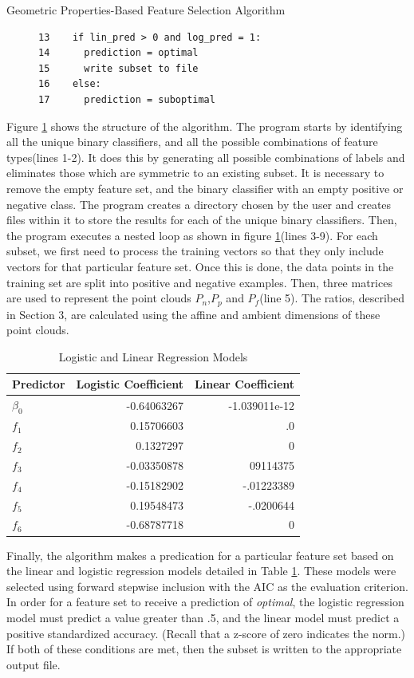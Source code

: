 \documentclass{llncs}
\begin{document}
\begin{section}{Geometric Properties-Based Feature Selection Algorithm}
\begin{figure}[h]
\begin{lstlisting}
13	  if lin_pred > 0 and log_pred = 1:
14		prediction = optimal
15		write subset to file
16	  else:
17		prediction = suboptimal
\end{lstlisting}
\label{fig:code}
\end{figure}
Figure \ref{fig:code} shows the structure of the algorithm. The program starts by identifying all the unique binary classifiers, and all the possible combinations of feature types(lines 1-2). It does this by generating all possible combinations of  labels and eliminates those which are symmetric to an existing subset. It is necessary to remove the empty feature set, and the binary classifier with an empty positive or negative class. The program creates a directory chosen by the user and creates files within it to store the results for each of the unique binary classifiers. Then, the program executes a nested loop as shown in figure \ref{fig:code}(lines 3-9). 
For each subset, we first need to process the training vectors so that they only include vectors for that particular feature set. Once this is done, the data points in the training set are split into positive and negative examples. Then, three matrices are used to represent the point clouds $P_n$,$P_p$ and $P_f$(line 5). The ratios, described in Section 3, are calculated using the affine and ambient dimensions of these point clouds.
\begin{table}[ht]
\centering
\caption{Logistic and Linear Regression Models}
\begin{tabular}{l r r }
\hline \hline
Predictor&Logistic Coefficient & Linear Coefficient \\
\hline
$\beta_0$&-0.64063267&-1.039011e-12\\
$f_1$&0.15706603&.0\\
$f_2$&0.1327297& 0\\
$f_3$&-0.03350878&09114375\\
$f_4$&-0.15182902& -.01223389\\
$f_5$&0.19548473&-.0200644\\
$f_6$&-0.68787718&0\\
\hline
\end{tabular}
\label{tab:models}
\end{table}


Finally, the algorithm makes a predication for a particular feature set based on the linear and logistic regression models detailed in Table \ref{tab:models}. These models were selected using forward stepwise inclusion with the AIC as the evaluation criterion. In order for a feature set to receive a prediction of {\em optimal}, the logistic regression model must predict a value greater than .5, and the linear model must predict a positive standardized accuracy. (Recall that a z-score of zero indicates the norm.) If both of these conditions are met, then the subset is written to the appropriate output file.
 


\end{section}
\end{document}
